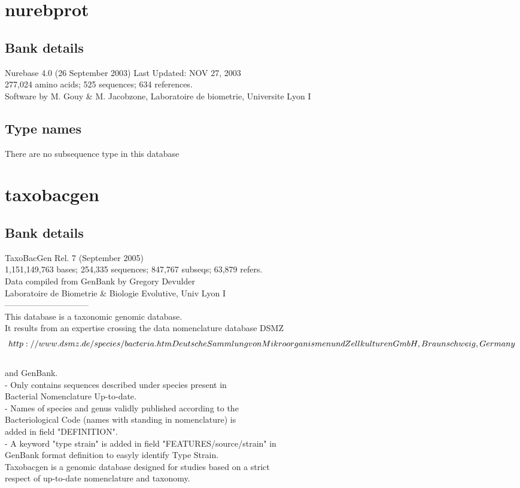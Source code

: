 \documentclass{article}
\begin{document}
\begin{Schunk}
\section{ nurebprot }
\subsection{Bank details}
Nurebase 4.0 (26 September 2003) Last Updated: NOV 27, 2003\\
277,024 amino acids; 525 sequences; 634 references.\\
Software by M. Gouy \& M. Jacobzone, Laboratoire de biometrie, Universite Lyon I

\subsection{Type names}
There are no subsequence type in this database
\section{ taxobacgen }
\subsection{Bank details}
TaxoBacGen Rel. 7 (September 2005)\\
1,151,149,763 bases; 254,335 sequences; 847,767 subseqs; 63,879 refers.\\
Data compiled from GenBank by Gregory Devulder\\
Laboratoire de Biometrie \& Biologie Evolutive, Univ Lyon I\\
------------------------------\\
This database is a taxonomic genomic database.\\
It results from an expertise crossing the data nomenclature database DSMZ\\
\[http://www.dsmz.de/species/bacteria.htm Deutsche Sammlung von\\
Mikroorganismen und Zellkulturen GmbH, Braunschweig, Germany\]\\
and GenBank.\\
- Only contains sequences described under species present in\\
Bacterial Nomenclature Up-to-date.\\
- Names of species and genus validly published according to the\\
Bacteriological Code (names with standing in nomenclature) is\\
added in field "DEFINITION".\\
- A keyword "type strain" is added in field "FEATURES/source/strain" in\\
GenBank format definition to easyly identify Type Strain.\\
Taxobacgen is a genomic database designed for studies based on a strict\\
respect of up-to-date nomenclature and taxonomy.


\end{Schunk}
\end{document}
